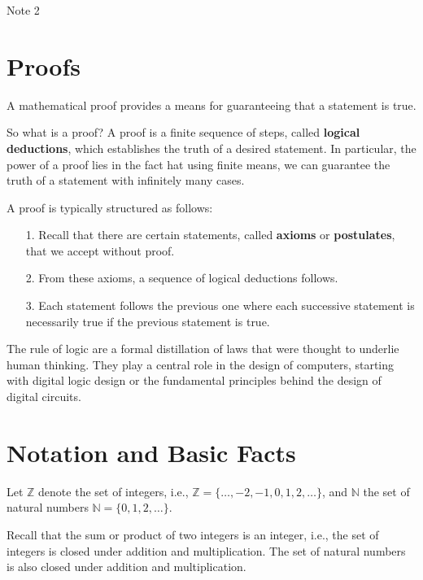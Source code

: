 \documentclass[12pt,a4paper]{article}
\begin{document}
\raggedright

\begin{center}
	\huge{Note 2}
\end{center}

\section*{Proofs}

A mathematical proof provides a means for guaranteeing that a statement is true. 

\bigbreak

So what is a proof? A proof is a finite sequence of steps, called \textbf{logical deductions}, which establishes the truth of a desired statement. In particular, the power of a proof lies in the fact hat using finite means, we can guarantee the truth of a statement with infinitely many cases.

\bigbreak

A proof is typically structured as follows:
\begin{itemize}
	\item[1.] Recall that there are certain statements, called \textbf{axioms} or \textbf{postulates}, that we accept without proof.
	\item[2.] From these axioms, a sequence of logical deductions follows.
	\item[3.] Each statement follows the previous one where each successive statement is necessarily true if the previous statement is true.
\end{itemize}

The rule of logic are a formal distillation of laws that were thought to underlie human thinking. They play a central role in the design of computers, starting with digital logic design or the fundamental principles behind the design of digital circuits.

\section*{Notation and Basic Facts}

Let $\mathbb{Z}$ denote the set of integers, i.e., $\mathbb{Z}=\{\dots,-2,-1,0,1,2,\dots\}$, and $\mathbb{N}$ the set of natural numbers $\mathbb{N}=\{0,1,2,\dots\}$.

\bigbreak

Recall that the sum or product of two integers is an integer, i.e., the set of integers is closed under addition and multiplication. The set of natural numbers is also closed under addition and multiplication.
\end{document}
